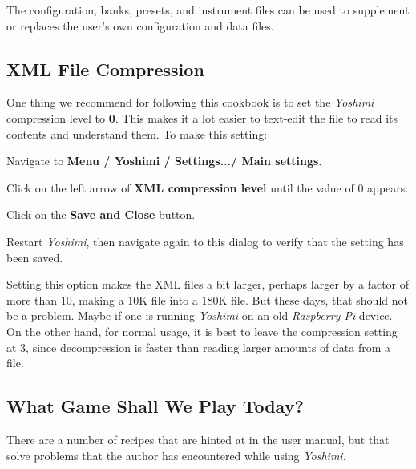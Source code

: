 \documentclass[
 11pt,
 twoside,
 a4paper,
 headinclude,
 footinclude,
 final                                 %
]{article}
\begin{document}
   The configuration, banks, presets, and instrument files can be used
   to supplement or replaces the user's own configuration and data files.

\subsection{XML File Compression}
\label{subsec:introduction_xml_files}

   One thing we recommend for following this cookbook is to set the
   \textsl{Yoshimi} compression level to \textbf{0}.  This makes it a lot
   easier to text-edit the file to read its contents and understand them.
   To make this setting:

   \begin{enumber}
      \item Navigate to \textbf{Menu / Yoshimi / Settings.../ Main settings}.
      \item Click on the left arrow of \textbf{XML compression level} until
         the value of 0 appears.
      \item Click on the \textbf{Save and Close} button.
      \item Restart \textsl{Yoshimi}, then navigate again to this dialog
         to verify that the setting has been saved.
   \end{enumber}

   Setting this option makes the XML files a bit larger, perhaps larger by a
   factor of more than 10, making a 10K file into a 180K file.
   But these days, that should not be a problem.  Maybe if one is running
   \textsl{Yoshimi} on an old \textsl{Raspberry Pi} device.
   On the other hand, for normal usage, it is best to leave the compression
   setting at 3, since decompression is faster than reading larger amounts of
   data from a file.

\subsection{What Game Shall We Play Today?}
\label{subsec:introduction_what_game}

   There are a number of recipes that are hinted at in the user manual, but
   that solve problems that the author has encountered while using
   \textsl{Yoshimi}.
\end{document}
